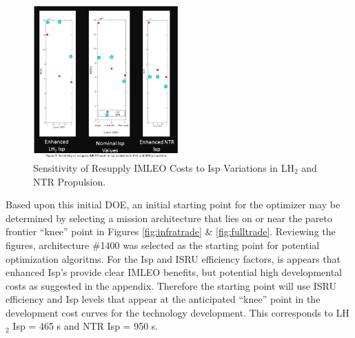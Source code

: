 \documentclass[]{aiaa-pretty}
\begin{document}
\begin{figure}[ht!]
	\centering
	\includegraphics[width=0.5\textwidth]{improvetrade}
	\caption{Sensitivity of Resupply IMLEO Costs to Isp Variations in LH$_2$ and NTR Propulsion.}
	\label{fig:senstrade}
\end{figure}

Based upon this initial DOE, an initial starting point for the optimizer may be determined by selecting a mission architecture that lies on or near the pareto frontier “knee” point in Figures \ref{fig:infratrade} \& \ref{fig:fulltrade}. Reviewing the figures, architecture \#1400 was selected as the starting point for potential optimization algoritms. For the Isp and ISRU efficiency factors, is appears that enhanced Isp’s provide clear IMLEO benefits, but potential high developmental costs as suggested in the appendix. Therefore the starting point will use ISRU efficiency and Isp levels that appear at the anticipated “knee” point in the development cost curves for the technology development. This corresponds to  LH$_2$ Isp = 465 s and NTR Isp = 950 s.
\end{document}
